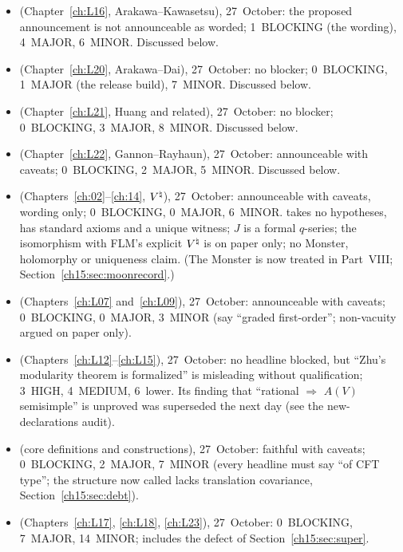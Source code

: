 \begin{itemize}
\item {} (Chapter~\ref{ch:L16}, Arakawa--Kawasetsu), 27~October: the proposed announcement is not
  announceable as worded; 1~BLOCKING (the wording), 4~MAJOR, 6~MINOR. Discussed below.
\item {} (Chapter~\ref{ch:L20}, Arakawa--Dai), 27~October: no blocker; 0~BLOCKING, 1~MAJOR (the
  release build), 7~MINOR. Discussed below.
\item {} (Chapter~\ref{ch:L21}, Huang and related), 27~October: no blocker; 0~BLOCKING, 3~MAJOR,
  8~MINOR. Discussed below.
\item {} (Chapter~\ref{ch:L22}, Gannon--Rayhaun), 27~October: announceable with caveats;
  0~BLOCKING, 2~MAJOR, 5~MINOR. Discussed below.
\item {} (Chapters~\ref{ch:02}--\ref{ch:14}, ${V^{\natural}}$), 27~October: announceable with caveats,
  wording only; 0~BLOCKING, 0~MAJOR, 6~MINOR.  takes no hypotheses, has standard axioms and a unique
  witness; $J$ is a formal $q$-series; the isomorphism with FLM's explicit ${V^{\natural}}$ is on paper only; no Monster,
  holomorphy or uniqueness claim. (The Monster is now treated in Part~VIII; Section~\ref{ch15:sec:moonrecord}.)
\item {} (Chapters~\ref{ch:L07} and~\ref{ch:L09}), 27~October: announceable with caveats;
  0~BLOCKING, 0~MAJOR, 3~MINOR (say ``graded first-order''; non-vacuity argued on paper only).
\item {} (Chapters~\ref{ch:L12}--\ref{ch:L15}), 27~October: no headline blocked, but ``Zhu's
  modularity theorem is formalized'' is misleading without qualification; 3~HIGH, 4~MEDIUM, 6~lower. Its finding that
  ``rational $\Rightarrow$ $A(V)$ semisimple'' is unproved was superseded the next day (see the new-declarations audit).
\item {} (core definitions and constructions), 27~October: faithful with caveats;
  0~BLOCKING, 2~MAJOR, 7~MINOR (every headline must say ``of CFT type''; the structure now called  lacks translation
  covariance, Section~\ref{ch15:sec:debt}).
\item {} (Chapters~\ref{ch:L17}, \ref{ch:L18}, \ref{ch:L23}), 27~October: 0~BLOCKING,
  7~MAJOR, 14~MINOR; includes the  defect of Section~\ref{ch15:sec:super}.

\end{itemize}
